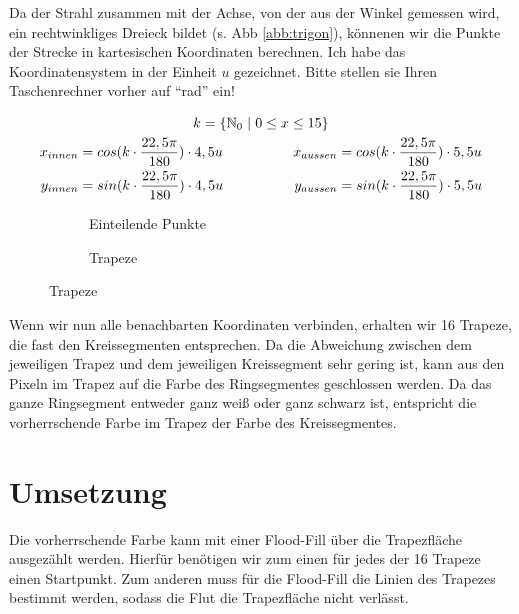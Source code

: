 	Da der Strahl zusammen mit der Achse, von der aus der Winkel gemessen wird, ein rechtwinkliges Dreieck bildet (s. Abb \ref{abb:trigon}), könnenen wir die Punkte der Strecke in kartesischen Koordinaten berechnen. Ich habe das Koordinatensystem in der Einheit \(u\) gezeichnet. Bitte stellen sie Ihren Taschenrechner vorher auf "`rad"' ein!

	\begin{gather}
	k = \{\mathbb{N}_0 \hspace{0.3em}|\hspace{0.3em} 0 \le x \le 15\} \\
	\begin{split}
	x_{innen} &= cos(k \cdot \frac{22,5\pi}{180}) \cdot 4,5u \\
	y_{innen} &= sin(k \cdot \frac{22,5\pi}{180}) \cdot 4,5u
	\end{split}
	\hspace{5em}
	\begin{split}
	x_{aussen} &= cos(k \cdot \frac{22,5\pi}{180}) \cdot 5,5u \\
	y_{aussen} &= sin(k \cdot \frac{22,5\pi}{180}) \cdot 5,5u
	\end{split}
	\end{gather}

	\begin{figure}[!ht]
		\begin{subfigure}[b]{0.5\textwidth}
			\centering	
			
			\caption{Einteilende Punkte}
		\end{subfigure}
		\begin{subfigure}[b]{0.5\textwidth}
			\centering	
			
			\caption{Trapeze}
		\end{subfigure}
	\end{figure}

	Wenn wir nun alle benachbarten Koordinaten verbinden, erhalten wir 16 Trapeze, die fast den Kreissegmenten entsprechen. Da die Abweichung zwischen dem jeweiligen Trapez und dem jeweiligen Kreissegment sehr gering ist, kann aus den Pixeln im Trapez auf die Farbe des Ringsegmentes geschlossen werden. Da das ganze Ringsegment entweder ganz weiß oder ganz schwarz ist, entspricht die vorherrschende Farbe im Trapez der Farbe des Kreissegmentes.
\section{Umsetzung}
	Die vorherrschende Farbe kann mit einer Flood-Fill über die Trapezfläche ausgezählt werden. Hierfür benötigen wir zum einen für jedes der 16 Trapeze einen Startpunkt. Zum anderen muss für die Flood-Fill die Linien des Trapezes bestimmt werden, sodass die Flut die Trapezfläche nicht verlässt.

